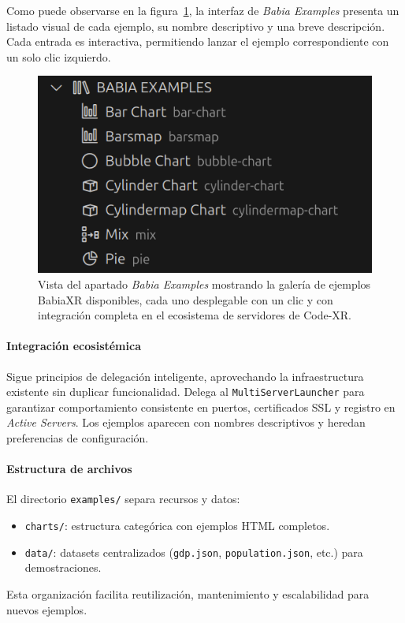 \documentclass[a4paper, 12pt]{book}
\begin{document}
Como puede observarse en la figura~\ref{fig:ui-babia-examples}, la interfaz de \emph{Babia Examples} presenta un listado visual de cada ejemplo, su nombre descriptivo y una breve descripción. Cada entrada es interactiva, permitiendo lanzar el ejemplo correspondiente con un solo clic izquierdo.

\begin{figure}[H]
\centering
\includegraphics[width=0.55\linewidth]{img/ui-babia-examples.png}
\caption{Vista del apartado \emph{Babia Examples} mostrando la galería de ejemplos BabiaXR disponibles, cada uno desplegable con un clic y con integración completa en el ecosistema de servidores de Code-XR.}
\label{fig:ui-babia-examples}
\end{figure}

\paragraph{Integración ecosistémica}
Sigue principios de delegación inteligente, aprovechando la infraestructura existente sin duplicar funcionalidad. Delega al \texttt{MultiServerLauncher} para garantizar comportamiento consistente en puertos, certificados SSL y registro en \emph{Active Servers}. Los ejemplos aparecen con nombres descriptivos y heredan preferencias de configuración.

\paragraph{Estructura de archivos}
El directorio \texttt{examples/} separa recursos y datos:
\begin{itemize}
  \item \texttt{charts/}: estructura categórica con ejemplos HTML completos.
  \item \texttt{data/}: datasets centralizados (\texttt{gdp.json}, \texttt{population.json}, etc.) para demostraciones.
\end{itemize}

Esta organización facilita reutilización, mantenimiento y escalabilidad para nuevos ejemplos.
\end{document}
